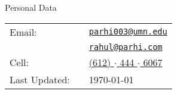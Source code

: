 \begin{rSection}{Personal Data}

    \begin{tabularx}{\linewidth}{lll}

      {\sc Email:}        && {\tt \href{mailto:parhi003@umn.edu}{parhi003@umn.edu}} \\
                          && {\tt \href{mailto:rahul@parhi.com}{rahul@parhi.com}} \\
      {\sc Cell:}         && \href{tel:16124446067}{(612) $\cdot$ 444 $\cdot$ 6067} \\
      {\sc Last Updated:} && \today

    \end{tabularx}





\end{rSection}
